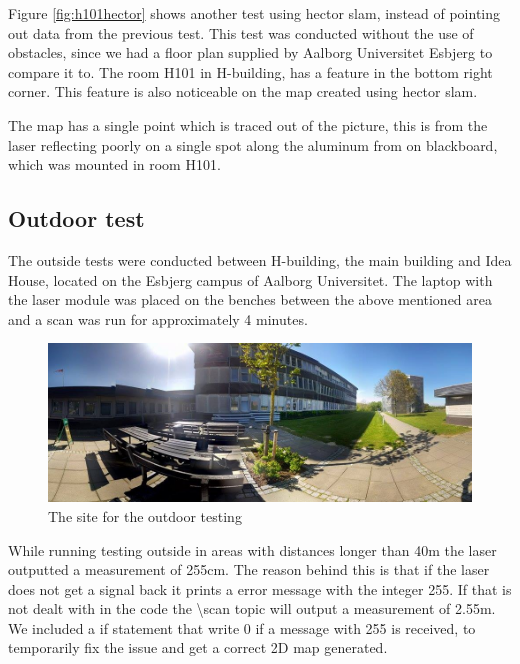 Figure \ref{fig:h101hector} shows another test using hector slam, instead of pointing out data from the previous test. This test was conducted without the use of obstacles, since we had a floor plan supplied by Aalborg Universitet Esbjerg to compare it to. The room H101 in H-building, has a feature in the bottom right corner. This feature is also noticeable on the map created using hector slam.

The map has a single point which is traced out of the picture, this is from the laser reflecting poorly on a single spot along the aluminum from on blackboard, which was mounted in room H101.

\subsection{Outdoor test}
The outside tests were conducted between H-building, the main building and Idea House, located on the Esbjerg campus of Aalborg Universitet. The laptop with the laser module was placed on the benches between the above mentioned area and a scan was run for approximately 4 minutes.

\begin{figure}[H]
	\centering
	\includegraphics[width=1\linewidth]{images/lidar_outside_site.jpg}
	\caption{The site for the outdoor testing}
	\label{fig:outsideslam}
\end{figure}

While running testing outside in areas with distances longer than 40m the laser outputted a measurement of 255cm. The reason behind this is that if the laser does not get a signal back it prints a error message with the integer 255. If that is not dealt with in the code the \textbackslash scan topic will output a measurement of 2.55m. We included a if statement that write 0 if a message with 255 is received, to temporarily fix the issue and get a correct 2D map generated. 

